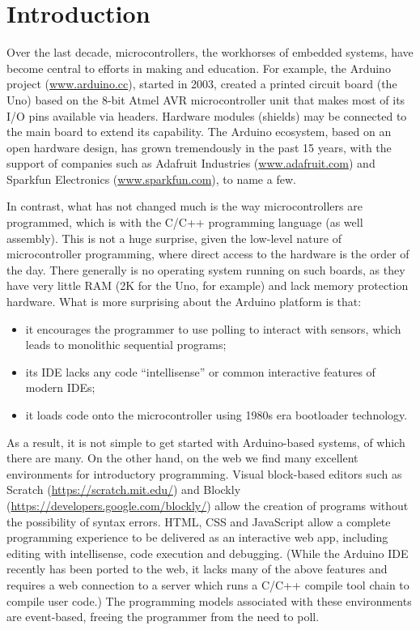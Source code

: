 \section{Introduction}
\label{sec:intro}

Over the last decade, microcontrollers, the workhorses of embedded systems, have become 
central to efforts in making and education. For example, the Arduino project (\url{www.arduino.cc}), 
started in 2003, created a printed circuit board (the Uno) based on the 8-bit Atmel 
AVR microcontroller unit that makes most of its I/O pins available via headers. Hardware modules 
(shields) may be connected to the main board to extend its capability. 
The Arduino ecosystem, based on an open hardware design, has grown tremendously in the past 15 years, 
with the support of companies such as Adafruit Industries (\url{www.adafruit.com}) and 
Sparkfun Electronics (\url{www.sparkfun.com}), to name a few.

In contrast, what has not changed much is the way microcontrollers are programmed,
which is with the C/C++ programming language (as well assembly).   
This is not a huge surprise, given the low-level nature of microcontroller programming, 
where direct access to the hardware is the order of the day. There generally is no operating 
system running on such boards, as they have very little RAM (2K for the Uno, for example) and 
lack memory protection hardware.  What is more surprising about the Arduino platform is that:
\begin{itemize}
\item it encourages the programmer to use polling to interact with sensors, 
which leads to monolithic sequential programs;
\item its IDE lacks any code ``intellisense'' or common interactive features of modern IDEs;
\item it loads code onto the microcontroller using 1980s era bootloader technology.
\end{itemize}
As a result, it is not simple to get started with Arduino-based systems, of which there are many. 
On the other hand, on the web we find many excellent environments for introductory programming. 
Visual block-based editors such as Scratch (\url{https://scratch.mit.edu/}) and Blockly (\url{https://developers.google.com/blockly/}) 
allow the creation of programs without the possibility of syntax errors. 
HTML, CSS and JavaScript allow a complete programming experience to be delivered as an interactive 
web app, including editing with intellisense, code execution and debugging. (While the Arduino IDE recently 
has been ported to the web, it lacks many of the above features and requires a web connection to a server which runs 
a C/C++ compile tool chain to compile user code.) The programming models associated with these environments are 
event-based, freeing the programmer from the need to poll.

